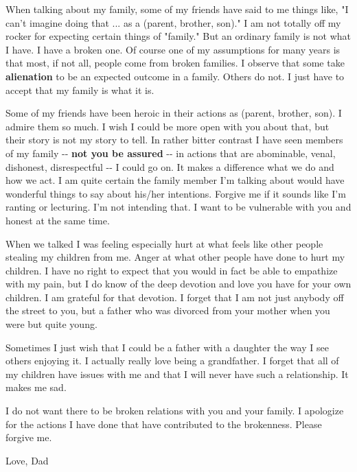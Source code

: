 \documentclass[]{article}
\begin{document}
When talking about my family, some of my friends have said to me things
like, "I can't imagine doing that ... as a (parent, brother, son)." I am
not totally off my rocker for expecting certain things of "family." But
an ordinary family is not what I have. I have a broken one. Of course
one of my assumptions for many years is that most, if not all, people
come from broken families. I observe that some take
\protect\hypertarget{alienation}{}{}\textbf{alienation} to be an
expected outcome in a family. Others do not. I just have to accept that
my family is what it is.

Some of my friends have been heroic in their actions as (parent,
brother, son). I admire them so much. I wish I could be more open with
you about that, but their story is not my story to tell. In rather
bitter contrast I have seen members of my family -\/-
\protect\hypertarget{notux20youux20beux20assured}{}{}\textbf{not you be
assured} -\/- in actions that are abominable, venal, dishonest,
disrespectful -\/- I could go on. It makes a difference what we do and
how we act. I am quite certain the family member I'm talking about would
have wonderful things to say about his/her intentions. Forgive me if it
sounds like I'm ranting or lecturing. I'm not intending that. I want to
be vulnerable with you and honest at the same time.

When we talked I was feeling especially hurt at what feels like other
people stealing my children from me. Anger at what other people have
done to hurt my children. I have no right to expect that you would in
fact be able to empathize with my pain, but I do know of the deep
devotion and love you have for your own children. I am grateful for that
devotion. I forget that I am not just anybody off the street to you, but
a father who was divorced from your mother when you were but quite
young.

Sometimes I just wish that I could be a father with a daughter the way I
see others enjoying it. I actually really love being a grandfather. I
forget that all of my children have issues with me and that I will never
have such a relationship. It makes me sad.

I do not want there to be broken relations with you and your family. I
apologize for the actions I have done that have contributed to the
brokenness. Please forgive me.

Love, Dad
\end{document}
